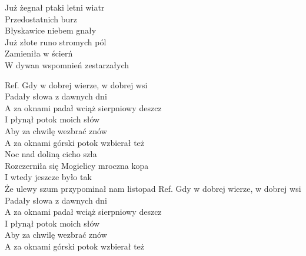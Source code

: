 
\begin{flushleft}
Już żegnał ptaki letni wiatr \tab{} \\
Przedostatnich burz \tab{} \\
Błyskawice niebem gnały \tab{} \\
\hop
Już złote runo stromych pól \tab{}  \\
Zamieniła w ścierń \tab{} \\
W dywan wspomnień zestarzałych 
\hops

Ref. Gdy w dobrej wierze, w dobrej wsi \tab{} \\
 Padały słowa z dawnych dni \tab{} \\
 A za oknami padał wciąż sierpniowy deszcz  \\
 I płynął potok moich słów \tab{} \\
 Aby za chwilę wezbrać znów \tab{} \\
 A za oknami górski potok wzbierał też\tab{} \\
\hops
Noc nad doliną cicho szła \\
Rozczerniła się Mogielicy mroczna kopa \\
I wtedy jeszcze było tak \\
Że ulewy szum przypominał nam listopad 
\hops
Ref. Gdy w dobrej wierze, w dobrej wsi\\
 Padały słowa z dawnych dni\\
 A za oknami padał wciąż sierpniowy deszcz\\
 I płynął potok moich słów\\
 Aby za chwilę wezbrać znów\\
 A za oknami górski potok wzbierał też\\
\end{flushleft}
\clearpage
